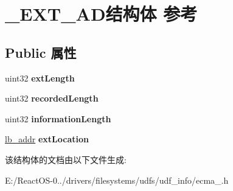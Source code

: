 \hypertarget{struct___e_x_t___a_d}{}\section{\+\_\+\+E\+X\+T\+\_\+\+A\+D结构体 参考}
\label{struct___e_x_t___a_d}
\subsection*{Public 属性}
\begin{DoxyCompactItemize}
\item 
\mbox{\label{struct___e_x_t___a_d_a9cc7b232f80af01ba724f4cc7e7b619d}} 
uint32 {\bfseries ext\+Length}
\item 
\mbox{\label{struct___e_x_t___a_d_a7b3ff514fce38abe7c6516be274b7b08}} 
uint32 {\bfseries recorded\+Length}
\item 
\mbox{\label{struct___e_x_t___a_d_a428a28ca45495f67a60c6a9031803665}} 
uint32 {\bfseries information\+Length}
\item 
\mbox{\label{struct___e_x_t___a_d_ab4ca1383ec547794b1c2276a507a3743}} 
\hyperlink{structlb__addr}{lb\+\_\+addr} {\bfseries ext\+Location}
\end{DoxyCompactItemize}


该结构体的文档由以下文件生成\+:\begin{DoxyCompactItemize}
\item 
E\+:/\+React\+O\+S-\/0../drivers/filesystems/udfs/udf\+\_\+info/ecma\+\_.\+h\end{DoxyCompactItemize}
